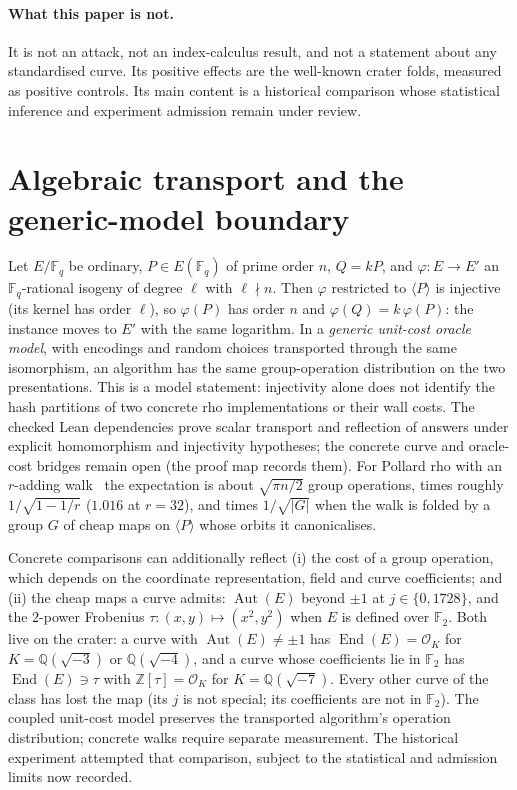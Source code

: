 \documentclass[10pt,a4paper]{article}
\theoremstyle{remark}
\newcommand{\FF}{\mathbb{F}}
\newcommand{\ZZ}{\mathbb{Z}}
\newcommand{\QQ}{\mathbb{Q}}
\newcommand{\OO}{\mathcal{O}}
\newcommand{\End}{\operatorname{End}}
\newcommand{\Aut}{\operatorname{Aut}}
\begin{document}
\paragraph{What this paper is not.} It is not an attack, not an
index-calculus result, and not a statement about any standardised curve.
Its positive effects are the well-known crater folds, measured as positive
controls. Its main content is a historical comparison whose statistical
inference and experiment admission remain under review.

\section{Algebraic transport and the generic-model boundary}
\label{sec:null}

Let $E/\FF_q$ be ordinary, $P \in E(\FF_q)$ of prime order $n$, $Q = kP$, and
$\varphi\colon E \to E'$ an $\FF_q$-rational isogeny of degree $\ell$ with
$\ell \nmid n$. Then $\varphi$ restricted to $\langle P\rangle$ is injective
(its kernel has order $\ell$), so $\varphi(P)$ has order $n$ and
$\varphi(Q) = k\,\varphi(P)$: the instance moves to $E'$ with the same
logarithm. In a \emph{generic unit-cost oracle model}, with encodings and
random choices transported through the same isomorphism, an algorithm has
the same group-operation distribution on the two presentations. This is a
model statement: injectivity alone does not identify the hash partitions of
two concrete rho implementations or their wall costs. The checked Lean
dependencies prove scalar transport and reflection of answers under explicit
homomorphism and injectivity hypotheses; the concrete curve and oracle-cost
bridges remain open (the proof map records them). For Pollard rho with an $r$-adding
walk~\cite{Pollard1978,Teske2001,vanOorschotWiener1999} the expectation is
about $\sqrt{\pi n/2}$ group operations, times roughly $1/\sqrt{1 - 1/r}$
($1.016$ at $r = 32$), and times $1/\sqrt{|G|}$ when the walk is folded by a
group $G$ of cheap maps on $\langle P\rangle$ whose orbits it canonicalises.

Concrete comparisons can additionally reflect (i) the cost of a group
operation, which depends on the coordinate representation, field and curve
coefficients; and (ii) the cheap maps a curve
admits: $\Aut(E)$ beyond $\pm 1$ at $j \in \{0, 1728\}$, and the $2$-power
Frobenius $\tau\colon (x, y) \mapsto (x^2, y^2)$ when $E$ is defined over
$\FF_2$. Both live on the crater: a curve with $\Aut(E) \ne \pm 1$ has
$\End(E) = \OO_K$ for $K = \QQ(\sqrt{-3})$ or $\QQ(\sqrt{-4})$, and a curve
whose coefficients lie in $\FF_2$ has $\End(E) \ni \tau$ with
$\ZZ[\tau] = \OO_K$ for $K = \QQ(\sqrt{-7})$. Every other curve of the class
has lost the map (its $j$ is not special; its coefficients are not in
$\FF_2$). The coupled unit-cost model preserves the transported algorithm's
operation distribution; concrete walks require separate measurement.
The historical experiment attempted that comparison, subject to the
statistical and admission limits now recorded.
\end{document}
